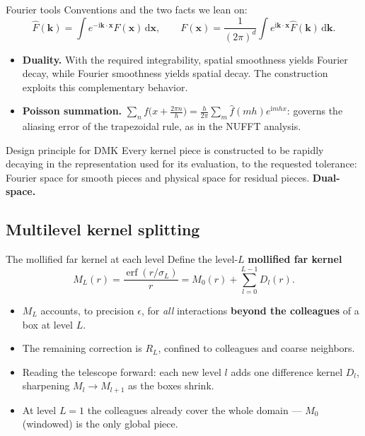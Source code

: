 \documentclass[aspectratio=169,11pt]{beamer}
\newcommand{\dd}{\,\mathrm d}
\newcommand{\ii}{\mathrm i}
\newcommand{\x}{\bm{x}}
\newcommand{\kk}{\bm{k}}
\newcommand{\hl}[1]{{\color{CCMorange}\textbf{#1}}}
\DeclareMathOperator{\erf}{erf}
\begin{document}
\begin{frame}{Fourier tools}
\small
Conventions and the two facts we lean on:
\[
  \widehat F(\kk)=\int e^{-\ii\kk\cdot\x}F(\x)\dd\x,\qquad
  F(\x)=\frac{1}{(2\pi)^d}\int e^{\ii\kk\cdot\x}\widehat F(\kk)\dd\kk .
\]
\begin{itemize}
  \item \hl{Duality.} With the required integrability, spatial smoothness yields Fourier decay, while Fourier smoothness yields spatial decay. The construction exploits this complementary behavior.
  \item \hl{Poisson summation.} \(\displaystyle\sum_n f\!\big(x+\tfrac{2\pi n}{h}\big)=\tfrac{h}{2\pi}\sum_m \widehat f(mh)e^{\ii mhx}\): governs the aliasing error of the trapezoidal rule, as in the NUFFT analysis.
\end{itemize}
\begin{block}{Design principle for DMK}
Every kernel piece is constructed to be rapidly decaying in the representation
used for its evaluation, to the requested tolerance: Fourier space for smooth
pieces and physical space for residual pieces. \hl{Dual-space.}
\end{block}
\end{frame}

\subsection{Multilevel kernel splitting}

\begin{frame}{The mollified far kernel at each level}
\small
Define the level-\(L\) \hl{mollified far kernel}
\[
  M_L(r)=\frac{\erf(r/\sigma_L)}{r}=M_0(r)+\sum_{l=0}^{L-1}D_l(r).
\]
\begin{itemize}
  \item \(M_L\) accounts, to precision \(\epsilon\), for \emph{all} interactions \hl{beyond the colleagues} of a box at level \(L\).
  \item The remaining correction is \(R_L\), confined to colleagues and coarse neighbors.
  \item Reading the telescope forward: each new level \(l\) adds one difference kernel \(D_l\), sharpening \(M_l\to M_{l+1}\) as the boxes shrink.
  \item At level \(L=1\) the colleagues already cover the whole domain --- \(M_0\) (windowed) is the only global piece.
\end{itemize}
\end{frame}
\end{document}
